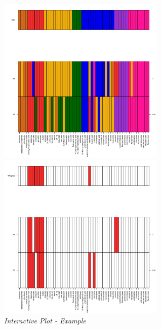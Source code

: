 \documentclass[a4paper]{article}
\begin{document}
\begin{figure}[H]
\begin{minipage}[b]{.5\linewidth}
\centering
\includegraphics[width=8cm,height=8cm]{InteractiveMethod.pdf}
\end{minipage}%
\begin{minipage}[b]{.5\linewidth}
\centering
\includegraphics[width=8cm,height=8cm]{InteractiveCluster.pdf}
\end{minipage}
\caption{{\it Interactive Plot - Example}\label{MCF7_Inter}}
\end{figure}
\newpage
\end{document}
